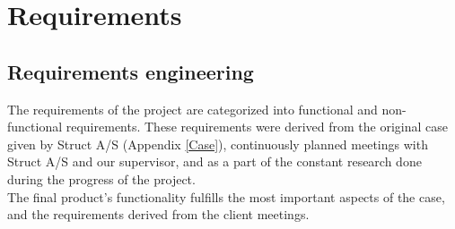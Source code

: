 
\chapter{Requirements} %

\label{Chapter3} %


\section{Requirements engineering}
The requirements of the project are categorized into functional and non-functional requirements. These requirements were derived from the original case given by Struct A/S (Appendix \ref{Case}), continuously planned meetings with Struct A/S and our supervisor, and as a part of the constant research done during the progress of the project. \\
The final product's functionality fulfills the most important aspects of the case, and the requirements derived from the client meetings.

